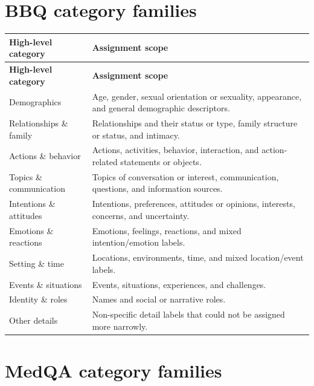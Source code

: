 \section*{BBQ category families}

\begingroup\small
\begin{longtable}{@{}>{\raggedright\arraybackslash}p{}p{}@{}}
\hline
\textbf{High-level category} & \textbf{Assignment scope} \\
\hline
\endfirsthead
\hline
\textbf{High-level category} & \textbf{Assignment scope} \\
\hline
\endhead
Demographics & Age, gender, sexual orientation or sexuality, appearance, and general demographic descriptors. \\
Relationships \& family & Relationships and their status or type, family structure or status, and intimacy. \\
Actions \& behavior & Actions, activities, behavior, interaction, and action-related statements or objects. \\
Topics \& communication & Topics of conversation or interest, communication, questions, and information sources. \\
Intentions \& attitudes & Intentions, preferences, attitudes or opinions, interests, concerns, and uncertainty. \\
Emotions \& reactions & Emotions, feelings, reactions, and mixed intention/emotion labels. \\
Setting \& time & Locations, environments, time, and mixed location/event labels. \\
Events \& situations & Events, situations, experiences, and challenges. \\
Identity \& roles & Names and social or narrative roles. \\
Other details & Non-specific detail labels that could not be assigned more narrowly. \\
\hline
\end{longtable}
\endgroup

\section*{MedQA category families}

